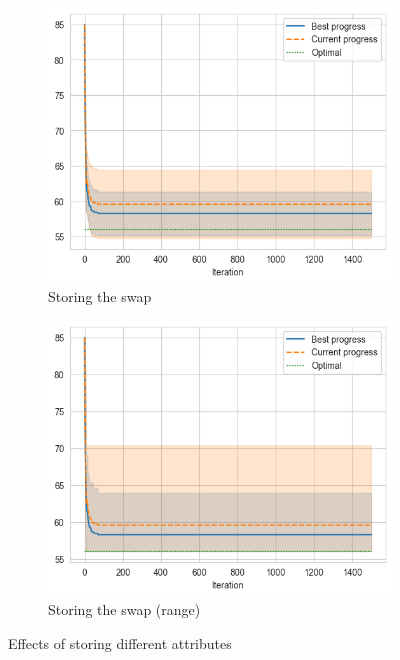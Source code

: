 \begin{figure}[ht]
    \hfill
    \begin{subfigure}{0.45\textwidth}
        \includegraphics[width=\textwidth]{../images/p3/store-swap.png}
        \caption{Storing the swap}
    \end{subfigure}
    \hfill
    \begin{subfigure}{0.45\textwidth}
        \includegraphics[width=\textwidth]{../images/p3/store-swap2.png}
        \caption{Storing the swap (range)}
    \end{subfigure}
    \hfill
    \caption{Effects of storing different attributes}
    \label{fig:p3-attrs}
\end{figure}

